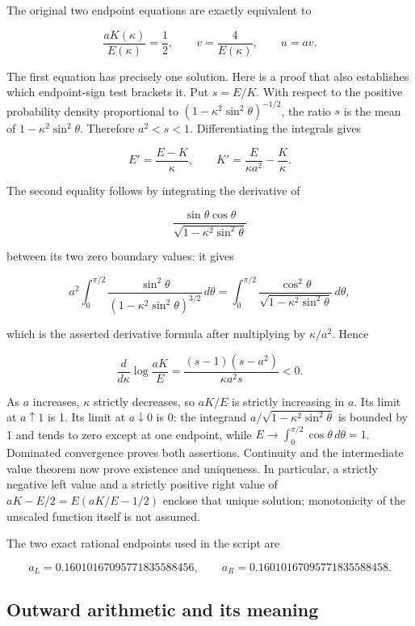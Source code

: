 \documentclass[11pt,a4paper]{article}
\begin{document}
The original two endpoint equations are exactly equivalent to

\[
 \frac{aK(\kappa)}{E(\kappa)}=\frac12,
 \qquad v=\frac4{E(\kappa)},\qquad u=av.
\]

The first equation has precisely one solution. Here is a proof that also establishes which endpoint-sign test brackets it. Put $s=E/K$. With respect to the positive probability density proportional to $(1-\kappa^2\sin^2\theta)^{-1/2}$, the ratio $s$ is the mean of $1-\kappa^2\sin^2\theta$. Therefore $a^2<s<1$. Differentiating the integrals gives

\[
 E'=\frac{E-K}{\kappa},\qquad
 K'=\frac{E}{\kappa a^2}-\frac K\kappa.
\]

The second equality follows by integrating the derivative of

\[
 \frac{\sin\theta\cos\theta}
 {\sqrt{1-\kappa^2\sin^2\theta}}
\]

between its two zero boundary values: it gives

\[
 a^2\int_0^{\pi/2}\frac{\sin^2\theta}
 {(1-\kappa^2\sin^2\theta)^{3/2}}\,d\theta
 =\int_0^{\pi/2}\frac{\cos^2\theta}
 {\sqrt{1-\kappa^2\sin^2\theta}}\,d\theta,
\]

which is the asserted derivative formula after multiplying by $\kappa/a^2$. Hence

\[
 \frac{d}{d\kappa}\log\frac{aK}{E}
 =\frac{(s-1)(s-a^2)}{\kappa a^2s}<0.
\]

As $a$ increases, $\kappa$ strictly decreases, so $aK/E$ is strictly increasing in $a$. Its limit at $a\uparrow1$ is 1. Its limit at $a\downarrow0$ is 0: the integrand $a/\sqrt{1-\kappa^2\sin^2\theta}$ is bounded by 1 and tends to zero except at one endpoint, while $E\to\int_0^{\pi/2}\cos\theta\,d\theta=1$. Dominated convergence proves both assertions. Continuity and the intermediate value theorem now prove existence and uniqueness. In particular, a strictly negative left value and a strictly positive right value of $aK-E/2=E(aK/E-1/2)$ enclose that unique solution; monotonicity of the unscaled function itself is not assumed.

The two exact rational endpoints used in the script are

\[
 a_L=0.16010167095771835588456,
 \qquad a_R=0.16010167095771835588458.
\]

\subsection{Outward arithmetic and its meaning}
\end{document}

